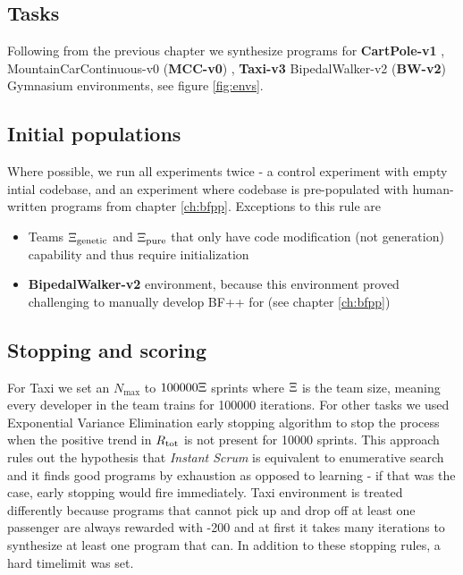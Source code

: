 \subsection{Tasks}
\label{sec:tasks}

Following from the previous chapter we synthesize programs for \textbf{CartPole-v1} \cite{bartoNeuronlikeAdaptiveElements1983}, MountainCarContinuous-v0 (\textbf{MCC-v0}) \cite{mooreEfficientMemorybasedLearning1990}, \textbf{Taxi-v3} \cite{dietterichHierarchicalReinforcementLearning2000} BipedalWalker-v2 (\textbf{BW-v2})  Gymnasium \cite{towersGymnasiumStandardInterface2024} environments, see figure \ref{fig:envs}.

\subsection{Initial populations}

Where possible, we run all experiments twice - a control experiment with empty intial codebase, and an experiment where codebase is pre-populated with human-written programs from chapter \ref{ch:bfpp}.
Exceptions to this rule are 
\begin{itemize}
    \item Teams $\Xi_\text{genetic}$ and $\Xi_\text{pure}$ that only have code modification (not generation) capability and thus require initialization 
    \item \textbf{BipedalWalker-v2} environment, because this environment proved challenging to manually develop BF++ for (see chapter \ref{ch:bfpp})
\end{itemize}

\subsection{Stopping and scoring}

For Taxi we set an $N_\text{max}$ to $100000 \Xi$ sprints where $\Xi$ is the team size, meaning every developer in the team trains for 100000 iterations.
For other tasks we used Exponential Variance Elimination \cite{liventsevVadim0x60EvestopEarly2021} early stopping algorithm to stop the process when the positive trend in $R_\text{tot}$ is not present for 10000 sprints.
This approach rules out the hypothesis that \emph{Instant Scrum} is equivalent to enumerative search and it finds good programs by exhaustion as opposed to learning - if that was the case, early stopping would fire immediately.
Taxi environment is treated differently because programs that cannot pick up and drop off at least one passenger are always rewarded with -200 and at first it takes many iterations to synthesize at least one program that can.
In addition to these stopping rules, a hard timelimit was set.

